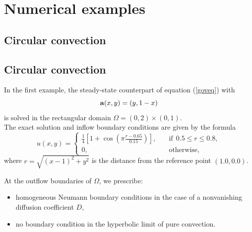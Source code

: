 \documentclass[mathserif]{beamer}
\begin{document}
\section{Numerical examples}
\subsection{Circular convection}

\begin{frame}

\subsection{Circular convection}
In the first example, the steady-state counterpart of equation (\ref{goveq}) with
$$\mathbf{a}(x,y)=(y,1-x)$$
 is
solved in the rectangular domain $\Omega=(0,2)\times(0,1)$.\ \\The exact
solution and inflow boundary conditions 
are given by the formula
\begin{equation}
u(x,y)=\left\{\begin{array}{ll}
\frac14\left[1+\cos\left(\pi\frac{r-0.65}{0.15}
\right)\right], &\quad \mbox{if} \ \ 0.5\le r \le 0.8,\\
0, & \quad\mbox{otherwise},
\end{array}\right.\label{circ-data}
\end{equation}
where $r=\sqrt{(x-1)^2+y^2}$ is the distance from the reference point 
$(1.0,0.0)$. 

At the outflow boundaries of $\Omega$, we prescribe:
\begin{itemize}
\item homogeneous Neumann boundary conditions in the case of a nonvanishing diffusion coefficient $D$,
\item no boundary condition in the hyperbolic limit of pure convection.
\end{itemize}
\end{frame}
\end{document}
